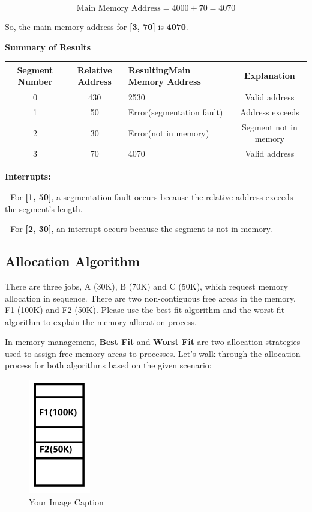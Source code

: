 \documentclass[a4paper]{book}
\begin{document}
\[
\text{Main Memory Address} = 4000 + 70 = 4070
\]

So, the main memory address for \textbf{[3, 70]} is \textbf{4070}.

\textbf{Summary of Results}

\vspace{0.5cm}
\begin{tabular}{|c|c|p{4cm}|c|}
    \hline
    Segment Number & Relative Address & Resulting\newline Main Memory Address & Explanation \\ \hline
    0   & 430   & 2530  & Valid address \\ \hline
    1   & 50    & Error\newline(segmentation fault)  & Address exceeds \\ \hline
	2   & 30   & Error\newline(not in memory) & Segment not in memory  \\ \hline
	3   & 70    & 4070  & Valid address \\ \hline
\end{tabular}

\textbf{Interrupts:}

- For \textbf{[1, 50]}, a segmentation fault occurs because the relative address exceeds the segment's length.

- For \textbf{[2, 30]}, an interrupt occurs because the segment is not in memory.

\newpage

\subsection{Allocation Algorithm}

\begin{greenbox}
There are three jobs, A (30K), B (70K) and C (50K), which request memory allocation in sequence. There are two non-contiguous free areas in the memory, F1 (100K) and F2 (50K). Please use the best fit algorithm and the worst fit algorithm to explain the memory allocation process.

In memory management, \textbf{Best Fit} and \textbf{Worst Fit} are two allocation strategies used to assign free memory areas to processes. Let's walk through the allocation process for both algorithms based on the given scenario:
\end{greenbox}

\begin{figure}[h]
    \centering
    \includegraphics[height=5cm]{img/memory-virtual_memory.jpg}  %
    \caption{Your Image Caption}
    \label{fig:your_label}
\end{figure}
\end{document}

